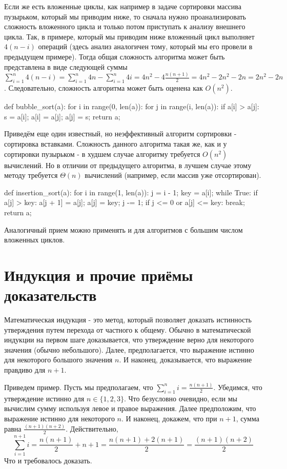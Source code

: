 Если же есть вложенные циклы, как например в задаче сортировки массива пузырьком, 
который мы приводим ниже, то сначала нужно проанализировать сложность 
вложенного цикла и только потом приступать к анализу внешнего цикла. Так, в примере,
который мы приводим ниже вложенный цикл выполняет $4(n-i)$ операций 
(здесь анализ аналогичен тому, который мы его 
провели в предыдущем примере). Тогда общая сложность
алгоритма может быть представлена в виде следующей суммы 
$\sum_{i=1}^n4(n-i) = \sum_{i=1}^n4n - \sum_{i=1}^n4i = 4n^2 - 4\frac{n(n+1)}{2} = 4n^2-2n^2 - 2n=2n^2 - 2n$.
Следовательно, сложность алгоритма может быть оценена как $O(n^2)$.

\begin{python}
def bubble_sort(a):
	for i in range(0, len(a)):
		for j in range(i, len(a)):
			if a[i] > a[j]:
				s = a[i];
				a[i] = a[j];
				a[j] = s;
	return a;
\end{python}

Приведём еще один известный, но неэффективный алгоритм сортировки - сортировка вставками. Сложность
данного алгоритма такая же, как и у сортировки пузырьком - в худшем случае алгоритму требуется $O(n^2)$
вычислений. Но в отличии от предыдущего алгоритма, в лучшем случае этому методу требуется $\Theta(n)$ вычислений
(например, если массив уже отсортирован).

\begin{python}
def insertion_sort(a):
	for i in range(1, len(a)):
		j = i - 1;
		key = a[i];
		while True:
			if a[j] > key:
				a[j + 1] = a[j];				
				a[j] = key;
				j -= 1;
			if j <= 0 or a[j] <= key:
				break;
	return a;
\end{python}


Аналогичный прием можно применять и для алгоритмов с большим числом вложенных
циклов.

\section{Индукция и прочие приёмы доказательств}

Математическая индукция - это метод, который позволяет доказать истинность утверждения
путем перехода от частного к общему. Обычно в математической индукции на первом шаге
доказывается, что утверждение верно для некоторого значения (обычно небольшого). Далее,
предполагается, что выражение истинно для некоторого большого значения $n$. И наконец, 
доказывается, что выражение правдиво для $n+1$.

Приведем пример. Пусть мы предполагаем, что $\sum_{i=1}^n i=\frac{n(n+1)}{2}$. Убедимся, что утверждение
истинно для $n \in \{1, 2, 3\}$. Что безусловно очевидно, если мы вычислим сумму используя левое и правое выражения.
Далее предположим, что выражение истинно для некоторого $n$. И наконец, докажем, что при $n+1$, сумма равна $\frac{(n+1)(n+2)}{2}$. Действительно, $$\sum_{i=1}^{n+1} i=\frac{n(n+1)}{2} + n+1 = \frac{n(n+1) + 2(n+1)}{2} = \frac{(n+1)(n+2)}{2}$$ Что и требовалось доказать.

